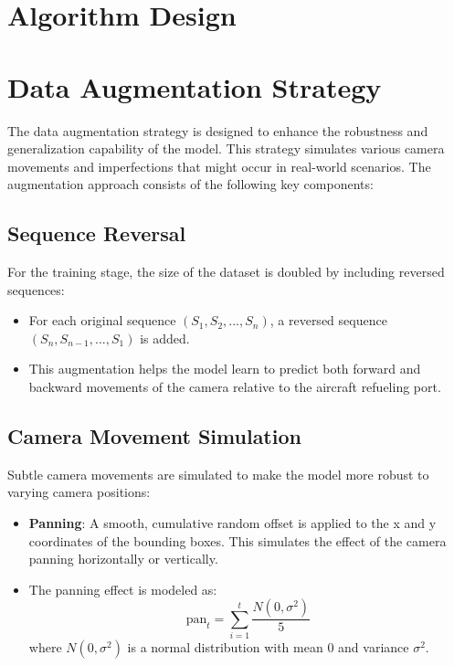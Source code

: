 \documentclass[12pt,oneside]{book} %
\begin{document}
\section{Algorithm Design}

\section{Data Augmentation Strategy}

The data augmentation strategy is designed to enhance the robustness and
generalization capability of the model. This strategy simulates various camera
movements and imperfections that might occur in real-world scenarios. The
augmentation approach consists of the following key components:

\subsection{Sequence Reversal}

For the training stage, the size of the dataset is doubled by including
reversed sequences:

\begin{itemize}
    \item For each original sequence $(S_1, S_2, ..., S_n)$, a reversed sequence $(S_n,
              S_{n-1}, ..., S_1)$ is added.
    \item This augmentation helps the model learn to predict both forward and backward
          movements of the camera relative to the aircraft refueling port.
\end{itemize}

\subsection{Camera Movement Simulation}

Subtle camera movements are simulated to make the model more robust to varying
camera positions:

\begin{itemize}
    \item \textbf{Panning}: A smooth, cumulative random offset is applied to the x and y coordinates of the bounding boxes. This simulates the effect of the camera panning horizontally or vertically.
    \item The panning effect is modeled as:
          \begin{equation}
              \text{pan}_t = \sum_{i=1}^t \frac{N(0, \sigma^2)}{5}
          \end{equation}
          where $N(0, \sigma^2)$ is a normal distribution with mean 0 and variance $\sigma^2$.
\end{itemize}
\end{document}
